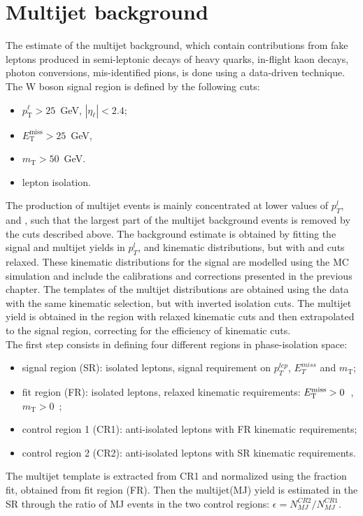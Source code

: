     \section{Multijet background}
 The estimate of the multijet background, which contain contributions from fake leptons produced in semi-leptonic decays of heavy quarks, in-flight kaon decays, photon conversions, mis-identified pions, is done using a data-driven technique. The W boson signal region is defined by the following cuts:
\begin{itemize}
	\item $p_\text{T}^\ell>25$~GeV, $|\eta_\ell|<2.4$;
	\item $E_\text{T}^\text{miss}>25$~GeV,
	\item $m_\text{T}>50$~GeV.
	\item lepton isolation.
\end{itemize}
The production of multijet events is mainly concentrated at lower values of $p_T^l$, \met and \mt, such that the largest part of the multijet background events is removed by the cuts described above. The background estimate is obtained by fitting the signal and multijet yields in $p_T^l$, \met and \mt kinematic distributions, but with \met and \mt cuts relaxed. These kinematic distributions for the signal are modelled using the MC simulation and include the calibrations and corrections presented in the previous chapter. The templates of the multijet distributions are obtained using the data with the same kinematic selection, but with inverted isolation cuts. The multijet yield is obtained in the region with relaxed kinematic cuts and then extrapolated to the signal region, correcting for the efficiency of kinematic cuts.\\
The first step consists in defining four different regions in phase-isolation space:
\begin{itemize}
	\item signal region (SR): isolated leptons, signal requirement on $p_{T}^{lep}$, $E_T^{miss}$ and $m_\text{T}$;
	\item fit region (FR): isolated leptons, relaxed kinematic requirements: $E_{\text{T}}^{\text{miss}}>0$~\gev, $m_\text{T}>0$~\gev;
	\item control region 1 (CR1): anti-isolated leptons with FR kinematic requirements;
	\item control region 2 (CR2): anti-isolated leptons with SR kinematic requirements.
\end{itemize}
 The multijet template is extracted from CR1 and normalized using the fraction fit, obtained from fit region (FR). Then the multijet(MJ) yield is estimated in the SR through the ratio of MJ events in the two control regions: $\epsilon = N_{MJ}^{CR2}/N_{MJ}^{CR1}$.
